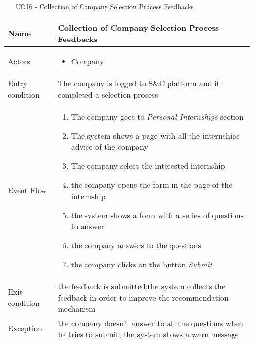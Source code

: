 				\begin{table} [H]
					\centering
					\begin{itemize}
						\item [UC16] - Collection of Company Selection Process Feedbacks
					\end{itemize}
					
					\begin{tabular}{|| P{7.5cm} | P{7.5cm} ||}
						\hline
						Name & Collection of Company Selection Process Feedbacks \\
						\hline
						Actors & \parbox{5cm}{\begin{itemize}
								\item Company
							\end{itemize}
						} \\
						\hline
						Entry condition & The company is logged to S\&C platform and it completed a selection process  \\
						\hline
						Event Flow & \parbox{5cm}{\begin{enumerate}[label=\alpha]
								\item The company goes to \textit{Personal Internships} section
								\item The system shows a page with 
								all the internships advice of the company  
								\item The company select the interested 
								internship  
								\item the company opens the form in the page of the internship
								\item the system shows a form with a series of questions to answer 
								\item the company answers to the questions
								\item the company clicks on the button \textit{Submit}
						\end{enumerate}} \\
						\hline 
						Exit condition & the feedback is submitted;the system collects the
						feedback in order to improve the recommendation
						mechanism \\
						\hline
						Exception & the company doesn't answer to all the questions when he tries to submit; the system shows a warn message \\
						\hline
					\end{tabular}
				\end{table}
				

